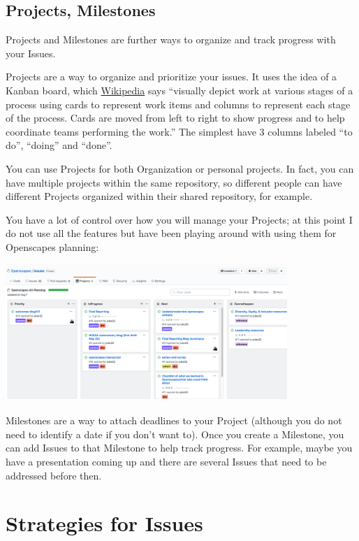\documentclass[
  letterpaper,
  DIV=11,
  numbers=noendperiod]{scrreprt}
\begin{document}
\hypertarget{projects-milestones}{%
\subsection{Projects, Milestones}\label{projects-milestones}}

Projects and Milestones are further ways to organize and track progress
with your Issues.

Projects are a way to organize and prioritize your issues. It uses the
idea of a Kanban board, which
\href{https://en.wikipedia.org/wiki/Kanban_board}{Wikipedia} says
``visually depict work at various stages of a process using cards to
represent work items and columns to represent each stage of the process.
Cards are moved from left to right to show progress and to help
coordinate teams performing the work.'' The simplest have 3 columns
labeled ``to do'', ``doing'' and ``done''.

You can use Projects for both Organization or personal projects. In
fact, you can have multiple projects within the same repository, so
different people can have different Projects organized within their
shared repository, for example.

You have a lot of control over how you will manage your Projects; at
this point I do not use all the features but have been playing around
with using them for Openscapes planning:

\includegraphics[width=0.8\textwidth,height=\textheight]{./img/issues-projects.png}

Milestones are a way to attach deadlines to your Project (although you
do not need to identify a date if you don't want to). Once you create a
Milestone, you can add Issues to that Milestone to help track progress.
For example, maybe you have a presentation coming up and there are
several Issues that need to be addressed before then.

\hypertarget{strategies-for-issues}{%
\section{Strategies for Issues}\label{strategies-for-issues}}
\end{document}
